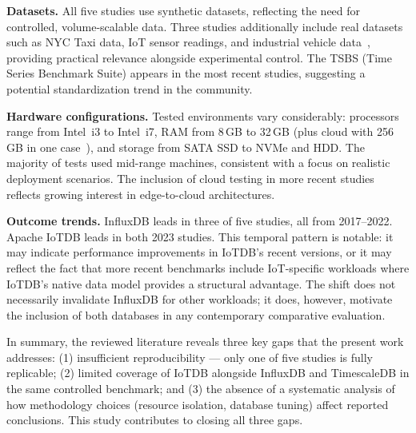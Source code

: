 \textbf{Datasets.} All five studies use synthetic datasets, reflecting the need for
controlled, volume-scalable data. Three studies additionally include real datasets such as
NYC Taxi data, IoT sensor readings, and industrial vehicle data~\cite{shah2022performance,
naqvi2017influxdb,wang2023iotdb}, providing practical relevance alongside experimental
control. The TSBS (Time Series Benchmark Suite) appears in the most recent studies,
suggesting a potential standardization trend in the community.

\textbf{Hardware configurations.} Tested environments vary considerably: processors range
from Intel~i3 to Intel~i7, RAM from 8\,GB to 32\,GB (plus cloud with 256\,GB in one
case~\cite{wang2023iotdb}), and storage from SATA SSD to NVMe and HDD. The majority of
tests used mid-range machines, consistent with a focus on realistic deployment scenarios.
The inclusion of cloud testing in more recent studies~\cite{pereira2023mulletbench,wang2023iotdb}
reflects growing interest in edge-to-cloud architectures.

\textbf{Outcome trends.} InfluxDB leads in three of five studies, all from 2017--2022.
Apache IoTDB leads in both 2023 studies. This temporal pattern is notable: it may indicate
performance improvements in IoTDB's recent versions, or it may reflect the fact that
more recent benchmarks include IoT-specific workloads where IoTDB's native data model
provides a structural advantage. The shift does not necessarily invalidate InfluxDB for
other workloads; it does, however, motivate the inclusion of both databases in any
contemporary comparative evaluation.

In summary, the reviewed literature reveals three key gaps that the present work addresses:
(1) insufficient reproducibility --- only one of five studies is fully replicable; (2) limited
coverage of IoTDB alongside InfluxDB and TimescaleDB in the same controlled benchmark; and
(3) the absence of a systematic analysis of how methodology choices (resource isolation,
database tuning) affect reported conclusions. This study contributes to closing all three gaps.

